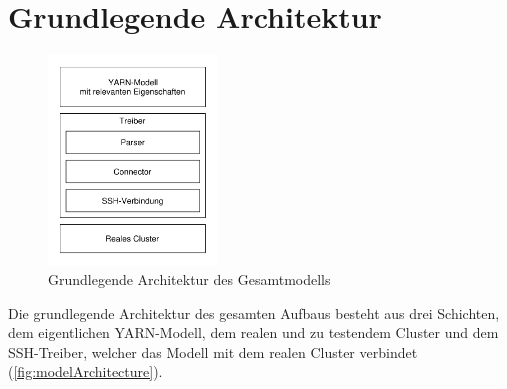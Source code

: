\section{Grundlegende Architektur}\label{sec:architecture}


\begin{figure}
	\begin{center}
		\includegraphics[width=0.4\textwidth]{./images/modelArchitecture.pdf}
	\end{center}
	\caption{Grundlegende Architektur des Gesamtmodells}
	\label{fig:modelArchitecture}
\end{figure}

Die grundlegende Architektur des gesamten Aufbaus besteht aus drei Schichten, dem eigentlichen YARN-Modell, dem realen und zu testendem Cluster und dem SSH-Treiber, welcher das Modell mit dem realen Cluster verbindet (\autoref{fig:modelArchitecture}).
